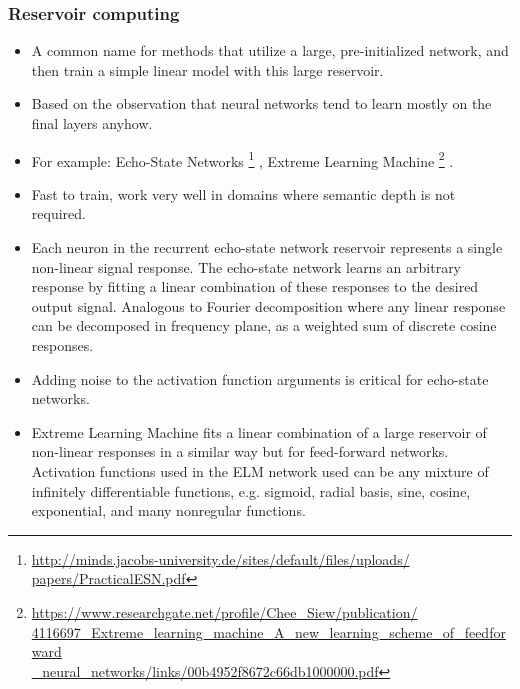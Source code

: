 \documentclass[8pt]{beamer}
\begin{document}
\begin{frame}
\frametitle{Reservoir computing}
 \begin{itemize}
 \item A common name for methods that utilize a large, pre-initialized network, and then train a simple linear model with this large reservoir.
 \item Based on the observation that neural networks tend to learn mostly on the final layers anyhow.
 \item For example: Echo-State Networks
       \footnote{\href{http://minds.jacobs-university.de/sites/default/files/uploads/papers/PracticalESN.pdf}
                      {http://minds.jacobs-university.de/sites/default/files/uploads/\\papers/PracticalESN.pdf}}
       , Extreme Learning Machine
       \footnote{\href{https://www.researchgate.net/profile/Chee\_Siew/publication/4116697\_Extreme\_learning\_machine\_A\_new\_learning\_scheme\_of\_feedforward\_neural\_networks/links/00b4952f8672c66db1000000.pdf}
                      {https://www.researchgate.net/profile/Chee\_Siew/publication/\\4116697\_Extreme\_learning\_machine\_A\_new\_learning\_scheme\_of\_feedforward\\\_neural\_networks/links/00b4952f8672c66db1000000.pdf}}
       .
 \item Fast to train, work very well in domains where semantic depth is not required.
 \item Each neuron in the recurrent echo-state network reservoir represents a single non-linear signal response. The echo-state network learns an arbitrary response by
       fitting a linear combination of these responses to the desired output signal. Analogous to Fourier decomposition where any linear response
       can be decomposed in frequency plane, as a weighted sum of discrete cosine responses.
 \item Adding noise to the activation function arguments is critical for echo-state networks.
 \item Extreme Learning Machine fits a linear combination of a large reservoir of non-linear responses in a similar way but for feed-forward networks.
       Activation functions used in the ELM network used can be any mixture of infinitely differentiable functions, e.g. sigmoid, radial basis, sine, cosine,
       exponential, and many nonregular functions.
\end{itemize}
\end{frame}
\end{document}
